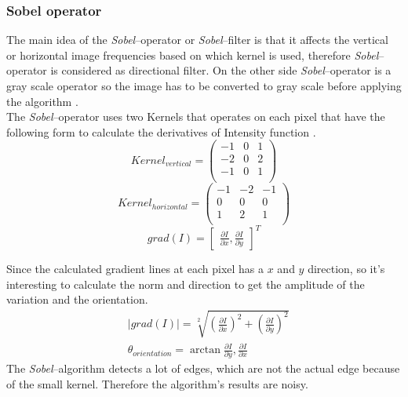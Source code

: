 \documentclass[journal,final,a4paper,twoside]{PS}
\begin{document}
\subsubsection{Sobel operator}
The main idea of the \emph{Sobel}--operator or \emph{Sobel}--filter is that it affects the vertical or horizontal image frequencies based on which kernel is used, therefore \emph{Sobel}--operator is considered as directional filter. On the other side \emph{Sobel}--operator is a gray scale operator so the image has to be converted to gray scale before applying the algorithm \cite{Langaniere}.
\\
The \emph{Sobel}--operator uses two Kernels that operates on each pixel that have the following form to calculate the derivatives of Intensity function \cite{Langaniere}.
\begin{equation}
Kernel_{vertical}=\begin{pmatrix}
-1&0&1\\
-2&0&2\\
-1&0&1\\
\end{pmatrix}
\end{equation}
\begin{equation}
Kernel_{horizontal}=\begin{pmatrix}
-1&-2&-1\\
0&0&0\\
1&2&1\\
\end{pmatrix}
\end{equation}
\begin{equation}
grad(I)=\begin{bmatrix}
\frac{\partial I}{\partial x},\frac{\partial I}{\partial y}
\end{bmatrix}^T
\end{equation}


Since the calculated gradient lines at each pixel has a $x$ and $y$ direction, so it's interesting to calculate the norm and direction to get the amplitude of the variation and the orientation.
\begin{align}
&|grad(I)|=\sqrt[2]{\left(\frac{\partial I}{\partial x}\right)^2+\left(\frac{\partial I}{\partial y}\right)^2}\\
&\theta_{orientation}=\arctan{\frac{\partial I}{\partial y},\frac{\partial I}{\partial x}}
\end{align}
The \emph{Sobel}--algorithm detects a lot of edges, which are not the actual edge because of the small kernel. Therefore the algorithm's results are noisy. 
\end{document}
